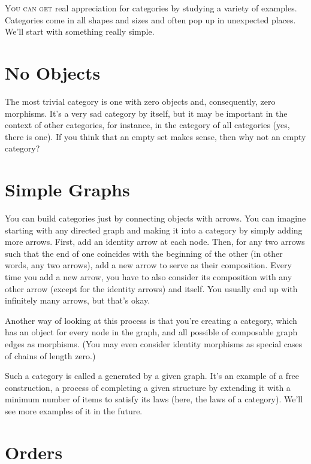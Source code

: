 \lettrine[lhang=0.17]{Y}{ou can get} real appreciation for categories by studying a variety of
examples. Categories come in all shapes and sizes and often pop up in
unexpected places. We'll start with something really simple.

\section{No Objects}\label{no-objects}

The most trivial category is one with zero objects and, consequently,
zero morphisms. It's a very sad category by itself, but it may be
important in the context of other categories, for instance, in the
category of all categories (yes, there is one). If you think that an
empty set makes sense, then why not an empty category?

\section{Simple Graphs}\label{simple-graphs}

You can build categories just by connecting objects with arrows. You can
imagine starting with any directed graph and making it into a category
by simply adding more arrows. First, add an identity arrow at each node.
Then, for any two arrows such that the end of one coincides with the
beginning of the other (in other words, any two 
arrows), add a new arrow to serve as their composition. Every time you
add a new arrow, you have to also consider its composition with any
other arrow (except for the identity arrows) and itself. You usually end
up with infinitely many arrows, but that's okay.

Another way of looking at this process is that you're creating a
category, which has an object for every node in the graph, and all
possible  of composable graph edges as morphisms. (You may
even consider identity morphisms as special cases of chains of length
zero.)

Such a category is called a  generated by a given
graph. It's an example of a free construction, a process of completing a
given structure by extending it with a minimum number of items to
satisfy its laws (here, the laws of a category). We'll see more examples
of it in the future.

\section{Orders}\label{orders}

